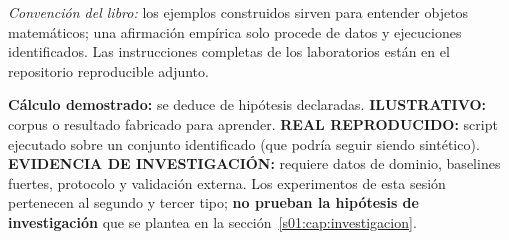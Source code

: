 \label{s01:mod:ruta}
\noindent\textit{Convención del libro:} los ejemplos construidos sirven para
entender objetos matemáticos; una afirmación empírica solo procede de
datos y ejecuciones identificados. Las instrucciones completas de los
laboratorios están en el repositorio reproducible adjunto.

\begin{contraste}
\textbf{Cálculo demostrado:} se deduce de hipótesis declaradas.
\textbf{ILUSTRATIVO:} corpus o resultado fabricado para aprender.
\textbf{REAL REPRODUCIDO:} script ejecutado sobre un conjunto identificado
(que podría seguir siendo sintético).
\textbf{EVIDENCIA DE INVESTIGACIÓN:} requiere datos de dominio,
baselines fuertes, protocolo y validación externa. Los experimentos de esta
sesión pertenecen al segundo y tercer tipo; \textbf{no prueban la hipótesis
de investigación} que se plantea en la sección~\ref{s01:cap:investigacion}.
\end{contraste}

